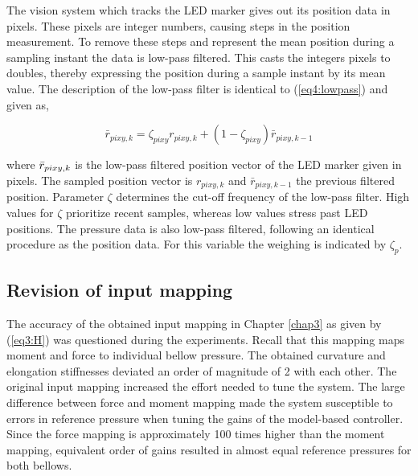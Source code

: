 The vision system which tracks the LED marker gives out its position data in pixels. These pixels are integer numbers, causing steps in the position measurement. To remove these steps and represent the mean position during a sampling instant the data is low-pass filtered. This casts the integers pixels to doubles, thereby expressing the position during a sample instant by its mean value. The description of the low-pass filter is identical to (\ref{eq4:lowpass}) and given as,

\begin{equation}
\bar{r}_{pixy,k} = \zeta_{pixy} r_{pixy,k} + (1-\zeta_{pixy})\bar{r}_{pixy,k-1}
\label{eq5:lowpass}
\end{equation}

where $\Bar{r}_{pixy,k}$ is the low-pass filtered position vector of the LED marker given in pixels. The sampled position vector is $r_{pixy,k}$ and $\bar{r}_{pixy,k-1}$ the previous filtered position. Parameter $\zeta$ determines the cut-off frequency of the low-pass filter. High values for $\zeta$ prioritize recent samples, whereas low values stress past LED positions. The pressure data is also low-pass filtered, following an identical procedure as the position data. For this variable the weighing is indicated by $\zeta_p$. 





\subsection*{Revision of input mapping}

The accuracy of the obtained input mapping in Chapter \ref{chap3} as given by (\ref{eq3:H}) was questioned during the experiments. Recall that this mapping maps moment and force to individual bellow pressure. The obtained curvature and elongation stiffnesses deviated an order of magnitude of 2 with each other. The original input mapping increased the effort needed to tune the system. The large difference between force and moment mapping made the system susceptible to errors in reference pressure when tuning the gains of the model-based controller. Since the force mapping is approximately 100 times higher than the moment mapping, equivalent order of gains resulted in almost equal reference pressures for both bellows.

